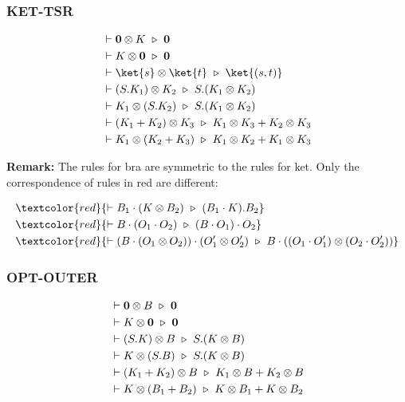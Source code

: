 \subsubsection*{\textsf{KET-TSR}}
\begin{align*}
  & \vdash \mathbf{0} \otimes K \reduce \mathbf{0} \\
  & \vdash K \otimes \mathbf{0} \reduce \mathbf{0} \\
  & \vdash \ket{s} \otimes \ket{t}\reduce\ket{(s, t)} \\
  & \vdash (S.K_1) \otimes K_2 \reduce S.(K_1 \otimes K_2) \\
  & \vdash K_1 \otimes (S.K_2) \reduce S.(K_1 \otimes K_2) \\
  & \vdash (K_1 + K_2) \otimes K_3 \reduce K_1 \otimes K_3 + K_2 \otimes K_3 \\
  & \vdash K_1 \otimes (K_2 + K_3) \reduce K_1 \otimes K_2 + K_1 \otimes K_3
\end{align*}

\textbf{Remark: } The rules for bra are symmetric to the rules for ket. Only the correspondence of rules in red are different:

\begin{align*}
  & \textcolor{red}{\vdash B_1 \cdot (K \otimes B_2) \reduce (B_1 \cdot K).B_2} \\
  & \textcolor{red}{\vdash B \cdot (O_1 \cdot O_2) \reduce (B \cdot O_1) \cdot O_2} \\
  & \textcolor{red}{\vdash (B \cdot (O_1 \otimes O_2)) \cdot (O_1' \otimes O_2') \reduce B \cdot ((O_1 \cdot O_1') \otimes (O_2 \cdot O_2'))}
\end{align*}

\subsubsection*{\textsf{OPT-OUTER}}
\begin{align*}
  & \vdash \mathbf{0} \otimes B \ \triangleright\  \mathbf{0} \\
  & \vdash K \otimes \mathbf{0} \ \triangleright\  \mathbf{0} \\
  & \vdash (S.K) \otimes B \ \triangleright\  S.(K \otimes B) \\
  & \vdash K \otimes (S.B) \ \triangleright\  S.(K \otimes B) \\
  & \vdash (K_1 + K_2) \otimes B \ \triangleright\  K_1 \otimes B + K_2 \otimes B \\
  & \vdash K \otimes (B_1 + B_2) \ \triangleright\  K \otimes B_1 + K \otimes B_2
\end{align*}

